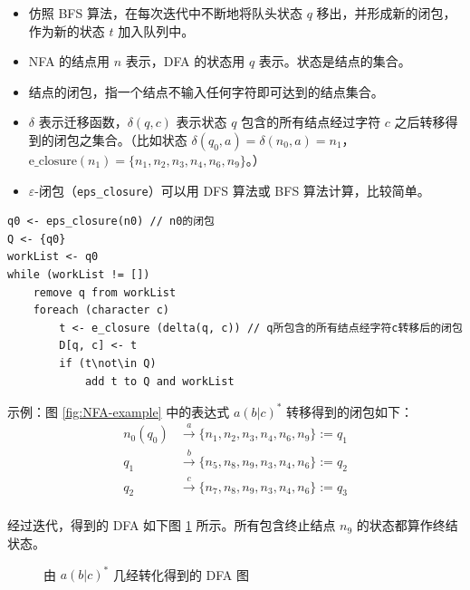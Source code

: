 \documentclass[UTF8]{ctexart}
\newcommand\Notes[1]{\textcolor{yellow!50!black}{\small #1}}
\begin{document}
\begin{itemize}[leftmargin=1.5cm]
  \item 仿照 BFS 算法，在每次迭代中不断地将队头状态 $q$ 移出，并形成新的闭包，作为新的状态 $t$ 加入队列中。
  \item NFA 的结点用 $n$ 表示，DFA 的状态用 $q$ 表示。状态是结点的集合。
  \item 结点的闭包，指一个结点不输入任何字符即可达到的结点集合。
  \item $\delta$ 表示迁移函数，$\delta(q,c)$ 表示状态 $q$ 包含的所有结点经过字符 $c$ 之后转移得到的闭包之集合。\Notes{（比如状态 $\delta(q_0,a) = \delta(n_0,a) = n_1$，$\mathrm{e\_closure}(n_1) = \{n_1,n_2,n_3,n_4,n_6,n_9\}$。）}
  \item $\varepsilon$-闭包（\verb!eps_closure!）可以用 DFS 算法或 BFS 算法计算，比较简单。
\end{itemize}

\begin{lstlisting}
q0 <- eps_closure(n0) // n0的闭包
Q <- {q0}
workList <- q0
while (workList != [])
    remove q from workList
    foreach (character c)
        t <- e_closure (delta(q, c)) // q所包含的所有结点经字符c转移后的闭包
        D[q, c] <- t
        if (t\not\in Q)
            add t to Q and workList
\end{lstlisting}

示例：图 \ref{fig:NFA-example} 中的表达式 $a(b|c)^*$ 转移得到的闭包如下：
\begin{align*}
    n_0(q_0) & \xrightarrow{a} \{n_1, n_2, n_3, n_4, n_6, n_9\} := q_1 \\
    q_1 &\xrightarrow{b} \{n_5, n_8, n_9, n_3, n_4, n_6\} := q_2 \\
    q_2 &\xrightarrow{c} \{n_7, n_8, n_9, n_3, n_4, n_6\} := q_3 \\
\end{align*}

经过迭代，得到的 DFA 如下图 \ref{fig:DFA-example} 所示。所有包含终止结点 $n_9$ 的状态都算作终结状态。
\begin{figure}[htb]
    \centering
    \caption{由 $a(b|c)^*$ 几经转化得到的 DFA 图}\label{fig:DFA-example}
\end{figure}
\end{document}
